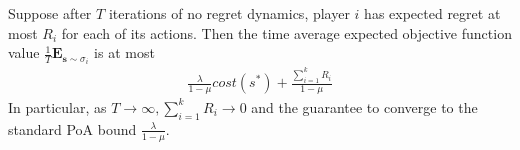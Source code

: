 \begin{cor}
Suppose after $T$ iterations of no regret dynamics, player $i$ has expected regret at most $R_i$ for each of its actions. Then the time average expected objective function value $\frac{1}{T}\mathbf{E}_{\mathbf{s}\sim\sigma_i}$ is at most 
\begin{align*}
\frac{\lambda}{1-\mu} cost(s^\ast)+\frac{\sum_{i=1}^{k}R_i}{1-\mu}
\end{align*}
In particular, as $T \to \infty, \sum_{i=1}^{k}R_i\to 0$ and the guarantee to converge to the standard PoA bound $\frac{\lambda}{1-\mu}$.
\end{cor}
%
%
%
%

